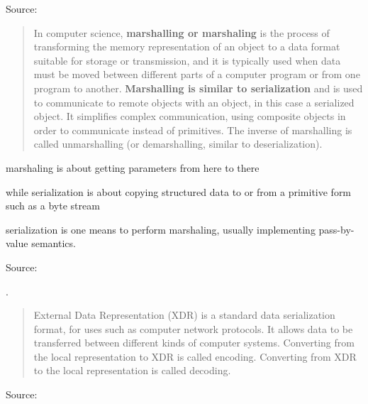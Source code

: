 \documentclass[Screen16to9,17pt]{foils}
\begin{document}
Source: {\footnotesize\\
}




\begin{quote}
In computer science, {\bf marshalling or marshaling} is the process of transforming the memory representation of an object to a data format suitable for storage or transmission, and it is typically used when data must be moved between different parts of a computer program or from one program to another. {\bf Marshalling is similar to serialization} and is used to communicate to remote objects with an object, in this case a serialized object. It simplifies complex communication, using composite objects in order to communicate instead of primitives. The inverse of marshalling is called unmarshalling (or demarshalling, similar to deserialization).
\end{quote}

\begin{list2}
  \item marshaling is about getting parameters from here to there
  \item while serialization is about copying structured data to or from a primitive form such as a byte stream
  \item serialization is one means to perform marshaling, usually implementing pass-by-value semantics.
\end{list2}

Source: {\footnotesize\\
}


.

\begin{quote}
External Data Representation (XDR) is a standard data serialization format, for uses such as computer network protocols. It allows data to be transferred between different kinds of computer systems. Converting from the local representation to XDR is called encoding. Converting from XDR to the local representation is called decoding.
\end{quote}

Source: {\footnotesize\\
\\ }
\end{document}
